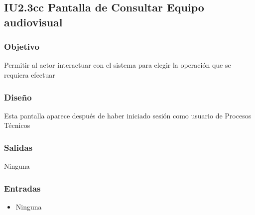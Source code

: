 \newpage
\subsection{IU2.3cc Pantalla de Consultar Equipo audiovisual}

\subsubsection{Objetivo}
	Permitir al actor interactuar con el sistema para elegir la operación que se requiera efectuar

\subsubsection{Diseño}
	Esta pantalla aparece después de haber iniciado sesión como usuario de Procesos Técnicos 


\subsubsection{Salidas}
	\begin{Citemize}
	        \item Ninguna
	\end{Citemize}
	
\subsubsection{Entradas}
		\begin{itemize}
        	\item Ninguna
        \end{itemize}  